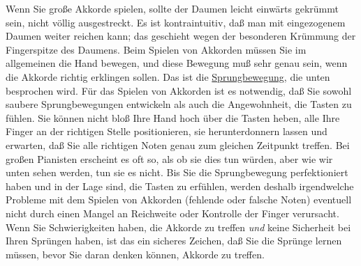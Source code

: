 Wenn Sie große Akkorde spielen, sollte der Daumen leicht einwärts gekrümmt sein, nicht völlig ausgestreckt.
Es ist kontraintuitiv, daß man mit eingezogenem Daumen weiter reichen kann; das geschieht wegen der besonderen Krümmung der Fingerspitze des Daumens.
Beim Spielen von Akkorden müssen Sie im allgemeinen die Hand bewegen, und diese Bewegung muß sehr genau sein, wenn die Akkorde richtig erklingen sollen.
Das ist die \hyperref[c1iii7f]{Sprungbewegung}, die unten besprochen wird.
Für das Spielen von Akkorden ist es notwendig, daß Sie sowohl saubere Sprungbewegungen entwickeln als auch die Angewohnheit, die Tasten zu fühlen.
Sie können nicht bloß Ihre Hand hoch über die Tasten heben, alle Ihre Finger an der richtigen Stelle positionieren, sie herunterdonnern lassen und erwarten, daß Sie alle richtigen Noten genau zum gleichen Zeitpunkt treffen.
Bei großen Pianisten erscheint es oft so, als ob sie dies tun würden, aber wie wir unten sehen werden, tun sie es nicht.
Bis Sie die Sprungbewegung perfektioniert haben und in der Lage sind, die Tasten zu erfühlen, werden deshalb irgendwelche Probleme mit dem Spielen von Akkorden (fehlende oder falsche Noten) eventuell nicht durch einen Mangel an Reichweite oder Kontrolle der Finger verursacht.
Wenn Sie Schwierigkeiten haben, die Akkorde zu treffen \textit{und} keine Sicherheit bei Ihren Sprüngen haben, ist das ein sicheres Zeichen, daß Sie die Sprünge lernen müssen, bevor Sie daran denken können, Akkorde zu treffen.
 


